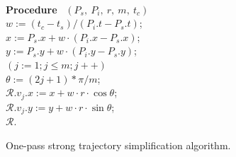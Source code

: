 \begin{figure}[tb!]
\begin{center}
{\begin{minipage}{3.3in}
{					%
					\\
					{\bf Procedure} ~$(P_s,~P_i,~r,~m,~t_c)$ \\
					\bcc \hspace{1ex} $w := (t_c-t_s)/(P_i.t - P_s.t)$; \\
					\icc \hspace{1ex} $x := P_s.x + w\cdot(P_i.x-P_s.x)$; \\
					\icc \hspace{1ex} $y := P_s.y + w\cdot(P_i.y-P_s.y)$; \\
					\icc \hspace{1ex} \For $(j := 1;j \le m;j++)$ \Do \\
					\icc \> \hspace{2ex} $\theta :=  (2j + 1)*\pi /m $; \\
					\icc \> \hspace{2ex} $\mathcal{R}.v_j.x := x + w\cdot r\cdot\cos\theta$;\\
					\icc \> \hspace{2ex} $\mathcal{R}.v_j.y := y + w\cdot r\cdot\sin\theta$;\\
					\icc \hspace{1ex} \Return $\mathcal{R}$.
				}
				\vspace{-2ex}
				\myhrule
			\end{minipage}
		}
	\end{center}
	\vspace{-1ex}
	\caption{\small One-pass strong trajectory  simplification algorithm.}
	\label{alg:CI3d}
	\vspace{-1ex}
\end{figure}



